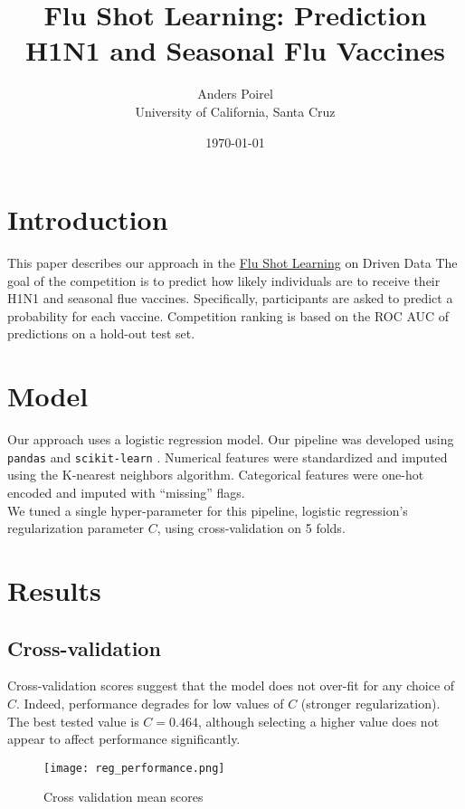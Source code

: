 \documentclass{article}[12pt]
\title{Flu Shot Learning: Prediction H1N1 and Seasonal Flu Vaccines}
\author{Anders Poirel \\ University of California, Santa Cruz}
\date{\today}
\begin{document}
    
\maketitle

\section{Introduction}

This paper describes our approach in 
the \href{https://www.drivendata.org/competitions/66/flu-shot-learning/}{Flu Shot Learning}
on Driven Data \cite{driven-data}
The goal of the competition is to predict how likely individuals are to receive their H1N1 and
seasonal flue vaccines. Specifically, participants are asked to predict a probability for
each vaccine. Competition ranking is based on the ROC AUC of predictions on a hold-out
test set.

\section{Model}

Our approach uses a logistic regression model. Our pipeline was developed using
\verb|pandas| \cite{scikit-learn} and \verb|scikit-learn| \cite{scikit-learn}. 
Numerical features were standardized and imputed using the K-nearest neighbors
algorithm. Categorical features were one-hot encoded and imputed with ``missing''
flags. \\
We tuned a single hyper-parameter for this pipeline, logistic regression's regularization
parameter $C$, using cross-validation on 5 folds. 

\section{Results}

\subsection{Cross-validation}

Cross-validation scores suggest that the model does not over-fit for any choice
of $C$. Indeed, performance degrades for low values of $C$ (stronger regularization).
The best tested value is $C = 0.464$, although selecting a higher value does not 
appear to affect performance significantly.

\begin{figure}
\caption{Cross validation mean scores}
\texttt{[image: reg\_performance.png]}
\end{figure}
\end{document}
